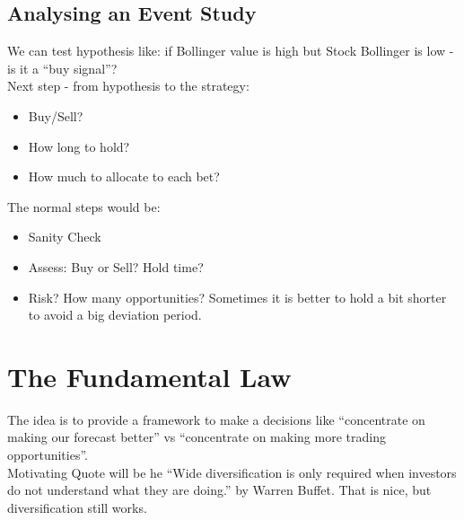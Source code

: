 \documentclass{scrartcl}
\begin{document}
\subsection{Analysing an Event Study}
\label{sec:8-1}

We can test hypothesis like: if Bollinger value is high but Stock Bollinger is
low - is it a ``buy signal''?\\
Next step - from hypothesis to the strategy:
\begin{itemize}
\item Buy/Sell?
\item How long to hold?
\item How much to allocate to each bet?
\end{itemize}

The normal steps would be:
\begin{itemize}
\item Sanity Check
\item Assess: Buy or Sell? Hold time? 
\item Risk? How many opportunities? Sometimes it is better to hold a bit shorter
  to avoid a big deviation period. 
\end{itemize}

\section{The Fundamental Law}
\label{sec:Module 2}
The idea is to provide a framework to make a decisions like ``concentrate on making our forecast better'' vs ``concentrate on making more trading opportunities''. \\

Motivating Quote will be he ``Wide diversification is only required when
investors do not understand what they are doing.'' by Warren Buffet. That is
nice, but diversification still works.
\end{document}

